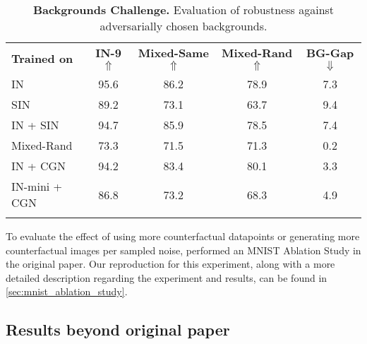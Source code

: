\begin{table}[H]
    \centering
    \captionsetup{skip=1mm, width=.85\textwidth}
    \caption{\textbf{Backgrounds Challenge.} Evaluation of robustness against adversarially chosen backgrounds.}
    \footnotesize
    \setlength{\aboverulesep}{0.95pt}
    \setlength{\belowrulesep}{0.95pt}
    \label{tab:mini-classifiers}

\begin{tabular}{lcccc@{}}
\toprule
\textbf{Trained on} & \textbf{IN-9} $\Uparrow$ & \textbf{Mixed-Same} $\Uparrow$ & \textbf{Mixed-Rand} $\Uparrow$ & \textbf{BG-Gap} $\Downarrow$     \\ \arrayrulecolor{black}\midrule
\cellcolor{blue!10}IN & 95.6  & 86.2  & 78.9  & 7.3  \\ \arrayrulecolor{lightgray}
\cmidrule(l){2-5}
\cellcolor{blue!10}SIN &  89.2  & 73.1  & 63.7  &  9.4  \\ \arrayrulecolor{lightgray}\cmidrule(l){2-5}
\cellcolor{blue!10}IN + SIN & 94.7  &  85.9  & 78.5  & 7.4   \\ \arrayrulecolor{lightgray}\cmidrule(l){2-5}
\cellcolor{blue!10}Mixed-Rand & 73.3  & 71.5  & 71.3  & 0.2  \\
\arrayrulecolor{black}\midrule
\cellcolor{blue!10}IN + CGN & 94.2  & 83.4  & 80.1  & 3.3  \\
\arrayrulecolor{lightgray}\cmidrule(l){2-5}
IN-mini + CGN & 86.8 & 73.2 & 68.3 & 4.9 \\
\arrayrulecolor{black}\bottomrule
\end{tabular}
\end{table}
To evaluate the effect of using more counterfactual datapoints or generating more counterfactual images per sampled noise, \citeauthor{Sauer2021ICLR} performed an MNIST Ablation Study in the original paper. Our reproduction for this experiment, along with a more detailed description regarding the experiment and results, can be found in \cref{sec:mnist_ablation_study}.



\subsection{Results beyond original paper} \label{ssec:extension-results}

